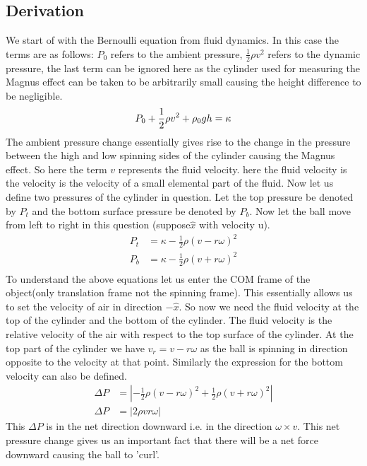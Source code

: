 \documentclass{article}
\begin{document}
\subsection{Derivation}
We start of with the Bernoulli equation from fluid dynamics.
In this case the terms are as follows: $P_0$ refers to the ambient pressure, $\frac{1}{2}\rho v^2$ refers to the dynamic pressure, the last term can be ignored here as the cylinder used for measuring the Magnus effect can be taken to be arbitrarily small causing the height difference to be negligible.
\begin{equation}
    P_0 + \frac{1}{2}\rho v^2 +\rho_0 gh = \kappa \\
\end{equation}
The ambient pressure change essentially gives rise to the change in the pressure between the high and low spinning sides of the cylinder causing the Magnus effect. So here the term $v$ represents the fluid velocity. here the fluid velocity is the velocity is the velocity of a small elemental part of the fluid. Now let us define two pressures of the cylinder in question. Let the top pressure be denoted by $P_t$ and the bottom surface pressure be denoted by $P_b$. Now let the ball move from left to right in this question (suppose$\hat{x}$ with velocity u).
\begin{align*}
    P_t &= \kappa - \frac{1}{2}\rho(v-r\omega)^2\\
    P_b &= \kappa - \frac{1}{2}\rho(v+r\omega)^2\\
\end{align*}
To understand the above equations let us enter the COM frame of the object(only translation frame not the spinning frame). This essentially allows us to set the velocity of air in direction $-\hat{x}$. So now we need the fluid velocity at the top of the cylinder and the bottom of the cylinder. The fluid velocity is the relative velocity of the air with respect to the top surface of the cylinder. At the top part of the cylinder we have $v_r = v-r\omega$ as the ball is spinning in direction opposite to the velocity at that point. Similarly the expression for the bottom velocity can also be defined.
\begin{align*}
    \Delta P &= |-\frac{1}{2}\rho(v-r\omega)^2 +\frac{1}{2}\rho(v+r\omega)^2|\\
    \Delta P &= |2\rho v r \omega|
\end{align*}
This $\Delta P$ is in the net direction downward i.e. in the direction $\omega \times v$. This net pressure change gives us an important fact that there will be a net force downward causing the ball to 'curl'.
\end{document}
